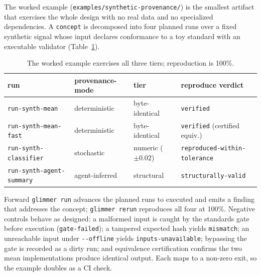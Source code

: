 \documentclass[preprint]{glimmer-paper}
\newcommand{\code}[1]{\texttt{#1}}
\begin{document}
The worked example (\code{examples/synthetic-provenance/}) is the smallest artifact that
exercises the whole design with no real data and no specialized dependencies. A \code{concept}
is decomposed into four planned runs over a fixed synthetic signal whose input declares
conformance to a toy standard with an executable validator (Table~\ref{tab:results}).

\begin{table}[h]
\centering
\small
\begin{tabular}{@{}llll@{}}
\toprule
run & provenance-mode & tier & reproduce verdict \\
\midrule
\code{run-synth-mean}          & deterministic   & byte-identical          & \code{verified} \\
\code{run-synth-mean-fast}     & deterministic   & byte-identical          & \code{verified} (certified equiv.) \\
\code{run-synth-classifier}    & stochastic      & numeric ($\pm 0.02$)    & \code{reproduced-within-tolerance} \\
\code{run-synth-agent-summary} & agent-inferred  & structural              & \code{structurally-valid} \\
\bottomrule
\end{tabular}
\caption{The worked example exercises all three tiers; reproduction is 100\%.}
\label{tab:results}
\end{table}

Forward \code{glimmer run} advances the planned runs to executed and emits a finding that
addresses the concept; \code{glimmer rerun} reproduces all four at 100\%. Negative controls
behave as designed: a malformed input is caught by the standards gate before execution
(\code{gate-failed}); a tampered expected hash yields \code{mismatch}; an unreachable input
under \code{-{}-offline} yields \code{inputs-unavailable}; bypassing the gate is recorded as a
dirty run; and equivalence certification confirms the two mean implementations produce
identical output. Each maps to a non-zero exit, so the example doubles as a CI check.
\end{document}
